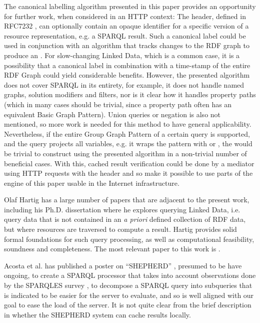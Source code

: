 The canonical labelling algorithm presented in this paper provides an
opportunity for further work, when considered in an HTTP context: The
 header, defined in RFC7232 \cite{rfc7232}, can optionally
contain an opaque identifier for a specific version of a resource
representation, e.g. a SPARQL result. Such a canonical label could be
used in conjunction with an algorithm that tracks changes to the RDF
graph to produce an . For slow-changing Linked Data, which
is a common case, it is a possibility that a canonical label in
combination with a time-stamp of the entire RDF Graph could yield
considerable benefits. However, the presented algorithm does not cover
SPARQL in its entirety, for example, it does not handle named graphs,
solution modifiers and filters, nor is it clear how it handles
property paths (which in many cases should be trivial, since a
property path often has an equivalent Basic Graph Pattern). Union
queries or negation is also not mentioned, so more work is needed for
this method to have general applicability. Nevertheless, if the entire
Group Graph Pattern of a certain query is supported, and the query
projects all variables, e.g. it wraps the pattern with  or , the  would be trivial to
construct using the presented algorithm in a non-trivial number of
beneficial cases. With this, cached result verification could be done
by a mediator using HTTP requests with the 
header and so make it possible to use parts of the engine of this
paper usable in the Internet infrastructure.



Olaf Hartig has a large number of papers that are adjacent to the
present work, including his Ph.D. dissertation \cite{hartig2014querying} where he
explores querying Linked Data, i.e. query data that is not contained
in an \textit{a priori} defined collection of RDF data, but where resources
are traversed to compute a result. Hartig provides solid formal
foundations for such query processing, as well as computational
feasibility, soundness and completeness. The most relevant paper to
this work is \cite{hartig2011caching}.

Acosta et al. has published a poster on ``SHEPHERD''
\cite{acosta2014shepherd}, presumed to be have ongoing, to
create a SPARQL processor that takes into account observations done by
the SPARQLES survey \cite{buil2013sparql}, to decompose a SPARQL query into
subqueries that is indicated to be easier for the server to evaluate,
and so is well aligned with our goal to ease the load of the
server. It is not quite clear from the brief description in 
\cite{acosta2014shepherd} whether the SHEPHERD system can cache results locally.

